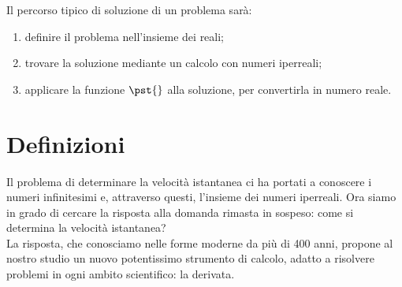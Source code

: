 % 
% 
Il percorso tipico di soluzione di un problema sarà: 
\begin{enumerate}
\item definire il problema nell'insieme dei reali;
\item trovare la soluzione mediante un calcolo con numeri iperreali;
\item applicare la funzione \(\pst{}\) alla soluzione, per convertirla in 
numero reale.
\end{enumerate}

\section{Definizioni}
\label{sec:differenziazione_definizioni}
Il problema di determinare la velocità istantanea ci ha portati a conoscere 
i numeri infinitesimi e, attraverso questi, l'insieme dei numeri iperreali.
Ora siamo in grado di cercare la risposta alla domanda rimasta in sospeso: 
come si determina la velocità istantanea?\\
La risposta, che conosciamo nelle forme moderne da più di 400 anni,
propone al nostro studio un nuovo potentissimo strumento di calcolo, 
adatto a risolvere problemi in ogni ambito scientifico: la derivata.

